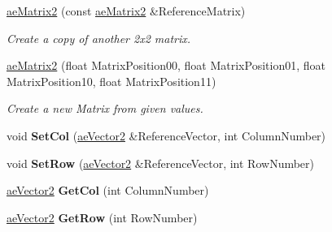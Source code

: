 \begin{DoxyCompactItemize}
\item 
\hyperlink{structae_core_1_1ae_matrix2_af2acf066a442a3982b2e93371d209b6e}{ae\+Matrix2} (const \hyperlink{structae_core_1_1ae_matrix2}{ae\+Matrix2} \&Reference\+Matrix)\hypertarget{structae_core_1_1ae_matrix2_af2acf066a442a3982b2e93371d209b6e}{}\label{structae_core_1_1ae_matrix2_af2acf066a442a3982b2e93371d209b6e}

\begin{DoxyCompactList}\small\item\em Create a copy of another 2x2 matrix. \end{DoxyCompactList}\item 
\hyperlink{structae_core_1_1ae_matrix2_ac1c8c301a89c48d6e26a5946a3dc505c}{ae\+Matrix2} (float Matrix\+Position00, float Matrix\+Position01, float Matrix\+Position10, float Matrix\+Position11)\hypertarget{structae_core_1_1ae_matrix2_ac1c8c301a89c48d6e26a5946a3dc505c}{}\label{structae_core_1_1ae_matrix2_ac1c8c301a89c48d6e26a5946a3dc505c}

\begin{DoxyCompactList}\small\item\em Create a new Matrix from given values. \end{DoxyCompactList}\item 
void {\bfseries Set\+Col} (\hyperlink{structae_core_1_1ae_vector2}{ae\+Vector2} \&Reference\+Vector, int Column\+Number)\hypertarget{structae_core_1_1ae_matrix2_a34813a9838b2d43ef443a36b376c9976}{}\label{structae_core_1_1ae_matrix2_a34813a9838b2d43ef443a36b376c9976}

\item 
void {\bfseries Set\+Row} (\hyperlink{structae_core_1_1ae_vector2}{ae\+Vector2} \&Reference\+Vector, int Row\+Number)\hypertarget{structae_core_1_1ae_matrix2_a66a2d4cbb0ee8a8acadcfa9347e63d18}{}\label{structae_core_1_1ae_matrix2_a66a2d4cbb0ee8a8acadcfa9347e63d18}

\item 
\hyperlink{structae_core_1_1ae_vector2}{ae\+Vector2} {\bfseries Get\+Col} (int Column\+Number)\hypertarget{structae_core_1_1ae_matrix2_a3be78323909e8f086d66ca072f66d812}{}\label{structae_core_1_1ae_matrix2_a3be78323909e8f086d66ca072f66d812}

\item 
\hyperlink{structae_core_1_1ae_vector2}{ae\+Vector2} {\bfseries Get\+Row} (int Row\+Number)\hypertarget{structae_core_1_1ae_matrix2_a0a5c4c5dca7ebbde54d5e6bce0419590}{}\label{structae_core_1_1ae_matrix2_a0a5c4c5dca7ebbde54d5e6bce0419590}


\end{DoxyCompactItemize}
